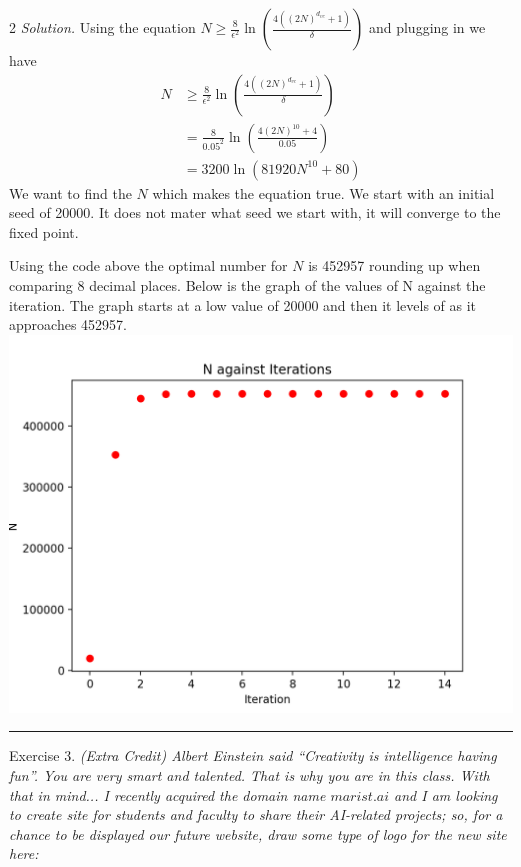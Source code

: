 \documentclass[12pt]{article}
\newcommand{\spacingfactor}{2}
\newcommand\myqed{}                 %
\newcommand{\printmyqed}[1][]       %
  {%
  \ifthenelse{\equal{#1}{Proof}}
  {\renewcommand{\myqed}{\qed}}
  {\renewcommand{\myqed}{}}
  }
\newenvironment{exercise}[1][]{%
  \bigskip                          %
  \noindent \textsf{Exercise #1.}\slshape }{}
\newenvironment{response}[1][\textit{Solution}]{%
  \printmyqed[#1]
  \begin{spacing}{\spacingfactor}
  \medskip                          %
  \noindent \textit{#1.}}{\myqed\end{spacing}\medskip\hrule}
\begin{document}
\begin{response}[Solution] 
  Using the equation $N \geq \frac{8}{\epsilon^2}\ln \left(\frac{4((2N)^{d_{vc}}+1)}{\delta}\right)$
  and plugging in we have 
  \begin{align*}
    N &\geq \frac{8}{\epsilon^2}\ln \left(\frac{4\left((2N)^{d_{vc}}+1\right)}{\delta}\right) \\
    &= \frac{8}{0.05^2}\ln \left(\frac{4(2N)^{10}+4}{0.05}\right) \\
    &= 3200\ln \left(81920N^{10}+80\right)
  \end{align*}
  We want to find the $N$ which makes the equation true.
  We start with an initial seed of 20000. It does not mater 
  what seed we start with, it will converge to the fixed point.  
 
  Using the code above the optimal number for $N$ is 
  452957 rounding up when comparing 8 decimal places.
  Below is the graph of the values of N against the iteration. 
  The graph starts at a low value of 20000 and then it levels 
  of as it approaches 452957. \\
  \includegraphics[width=150mm]{pics/q2_N.png} 
\end{response}


\begin{exercise}[3] %
  (Extra Credit) Albert Einstein said “Creativity is intelligence 
  having fun”. You are very smart and talented. That is why you 
  are in this class. With that in mind... I recently acquired the 
  domain name $marist.ai$ and I am looking to create site for 
  students and faculty to share their AI-related projects;
  so, for a chance to be displayed our future website, draw some 
  type of logo for the new site here:
\end{exercise}
   
\end{document}
